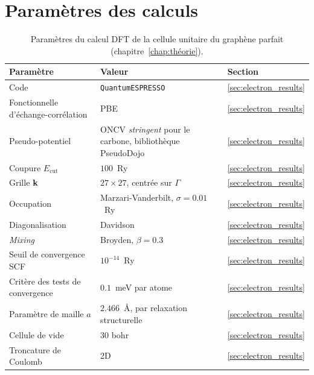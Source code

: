 \section{Paramètres des calculs}\label{sec:annexe_param_dft}
\vspace*{\fill}
\begin{table}[H]
    \centering
    \caption[Paramètres du calcul DFT de la cellule unitaire.]{Paramètres du calcul DFT de la cellule unitaire du graphène parfait (chapitre~\ref{chap:théorie}).}
    \label{tab:param_dft}
    \small
    \setlength{\tabcolsep}{4pt}
    \begin{tabular}{p{} p{} p{}}
        \hline\hline
        Paramètre & Valeur & Section \\
        \hline
        Code & \texttt{QuantumESPRESSO} & \ref{sec:electron_results} \\
        Fonctionnelle d'échange-corrélation & PBE & \ref{sec:electron_results} \\
        Pseudo-potentiel & ONCV \textit{stringent} pour le carbone, bibliothèque PseudoDojo & \ref{sec:electron_results} \\
        Coupure $E_\text{cut}$ & $100$~Ry & \ref{sec:electron_results} \\
        Grille $\mathbf{k}$ & $27\times 27$, centrée sur $\Gamma$ & \ref{sec:electron_results} \\
        Occupation & Marzari-Vanderbilt, $\sigma = 0.01$~Ry & \ref{sec:electron_results} \\
        Diagonalisation & Davidson & \ref{sec:electron_results} \\
        \textit{Mixing} & Broyden, $\beta = 0.3$ & \ref{sec:electron_results} \\
        Seuil de convergence SCF & $10^{-14}$~Ry & \ref{sec:electron_results} \\
        Critère des tests de convergence & $0.1$~meV par atome & \ref{sec:electron_results} \\
        Paramètre de maille $a$ & $2.466$~\AA{}, par relaxation structurelle & \ref{sec:electron_results} \\
        Cellule de vide & 30 bohr & \ref{sec:electron_results}\\
        Troncature de Coulomb & 2D & \ref{sec:electron_results}\\
        \hline\hline
    \end{tabular}
\end{table}
\vspace*{\fill}
